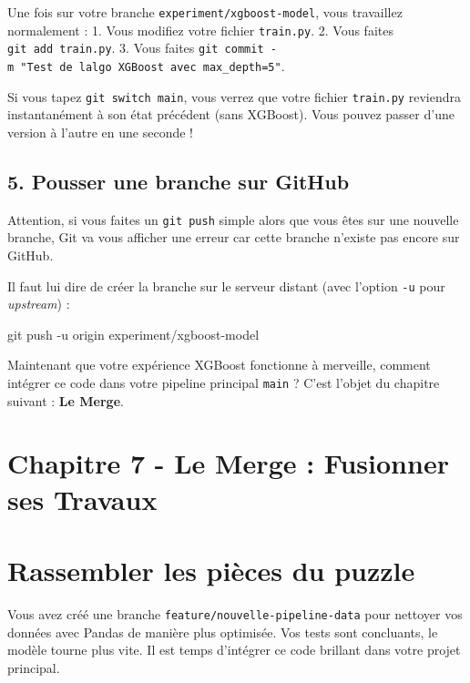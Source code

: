 \documentclass[
  letterpaper,
  DIV=11,
  numbers=noendperiod]{scrreprt}
\newenvironment{Shaded}{\begin{snugshade}}{\end{snugshade}}
\newcommand{\AttributeTok}[1]{\textcolor[rgb]{0.40,0.45,0.13}{#1}}
\newcommand{\FunctionTok}[1]{\textcolor[rgb]{0.28,0.35,0.67}{#1}}
\newcommand{\NormalTok}[1]{\textcolor[rgb]{0.00,0.23,0.31}{#1}}
\begin{document}
Une fois sur votre branche \texttt{experiment/xgboost-model}, vous
travaillez normalement : 1. Vous modifiez votre fichier
\texttt{train.py}. 2. Vous faites \texttt{git\ add\ train.py}. 3. Vous
faites
\texttt{git\ commit\ -m\ "Test\ de\ l\textquotesingle{}algo\ XGBoost\ avec\ max\_depth=5"}.

Si vous tapez \texttt{git\ switch\ main}, vous verrez que votre fichier
\texttt{train.py} reviendra instantanément à son état précédent (sans
XGBoost). Vous pouvez passer d'une version à l'autre en une seconde !

\subsection{5. Pousser une branche sur
GitHub}\label{pousser-une-branche-sur-github}

Attention, si vous faites un \texttt{git\ push} simple alors que vous
êtes sur une nouvelle branche, Git va vous afficher une erreur car cette
branche n'existe pas encore sur GitHub.

Il faut lui dire de créer la branche sur le serveur distant (avec
l'option \texttt{-u} pour \emph{upstream}) :

\begin{Shaded}
\begin{Highlighting}[]
\FunctionTok{git}\NormalTok{ push }\AttributeTok{{-}u}\NormalTok{ origin experiment/xgboost{-}model}
\end{Highlighting}
\end{Shaded}

Maintenant que votre expérience XGBoost fonctionne à merveille, comment
intégrer ce code dans votre pipeline principal \texttt{main} ? C'est
l'objet du chapitre suivant : \textbf{Le Merge}.


\section{Chapitre 7 - Le Merge : Fusionner ses
Travaux}\label{chapitre-7---le-merge-fusionner-ses-travaux}


\section{Rassembler les pièces du
puzzle}\label{rassembler-les-piuxe8ces-du-puzzle}

Vous avez créé une branche \texttt{feature/nouvelle-pipeline-data} pour
nettoyer vos données avec Pandas de manière plus optimisée. Vos tests
sont concluants, le modèle tourne plus vite. Il est temps d'intégrer ce
code brillant dans votre projet principal.
\end{document}
